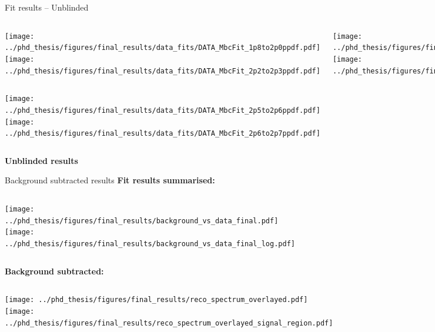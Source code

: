 \documentclass[xcolor=dvipsnames]{beamer}
\begin{document}
\begin{frame}{Fit results -- Unblinded}
\begin{columns}
   \centering
   \texttt{[image: ../phd\_thesis/figures/final\_results/data\_fits/DATA\_MbcFit\_1p8to2p0ppdf.pdf]}
   \texttt{[image: ../phd\_thesis/figures/final\_results/data\_fits/DATA\_MbcFit\_2p2to2p3ppdf.pdf]}

   \centering
   \texttt{[image: ../phd\_thesis/figures/final\_results/data\_fits/DATA\_MbcFit\_2p0to2p1ppdf.pdf]}
   \texttt{[image: ../phd\_thesis/figures/final\_results/data\_fits/DATA\_MbcFit\_2p3to2p4ppdf.pdf]}

   \centering
   \texttt{[image: ../phd\_thesis/figures/final\_results/data\_fits/DATA\_MbcFit\_2p1to2p2ppdf.pdf]}
   \texttt{[image: ../phd\_thesis/figures/final\_results/data\_fits/DATA\_MbcFit\_2p4to2p5ppdf.pdf]}
\end{columns}
\begin{columns}
   \centering
   \texttt{[image: ../phd\_thesis/figures/final\_results/data\_fits/DATA\_MbcFit\_2p5to2p6ppdf.pdf]}
   \centering
   \texttt{[image: ../phd\_thesis/figures/final\_results/data\_fits/DATA\_MbcFit\_2p6to2p7ppdf.pdf]}

\end{columns}
\end{frame}

\begin{frame}
   \centering
   \textbf{Unblinded results}
\end{frame}

\begin{frame}{Background subtracted results}
   \centering\scriptsize
\textbf{Fit results summarised:}
\begin{columns}
   \centering
   \texttt{[image: ../phd\_thesis/figures/final\_results/background\_vs\_data\_final.pdf]}
   \centering
   \texttt{[image: ../phd\_thesis/figures/final\_results/background\_vs\_data\_final\_log.pdf]}
\end{columns}
\textbf{Background subtracted:}

\begin{columns}
   \centering
   \texttt{[image: ../phd\_thesis/figures/final\_results/reco\_spectrum\_overlayed.pdf]}
   \centering
   \texttt{[image: ../phd\_thesis/figures/final\_results/reco\_spectrum\_overlayed\_signal\_region.pdf]}
\end{columns}

\end{frame}
\end{document}
